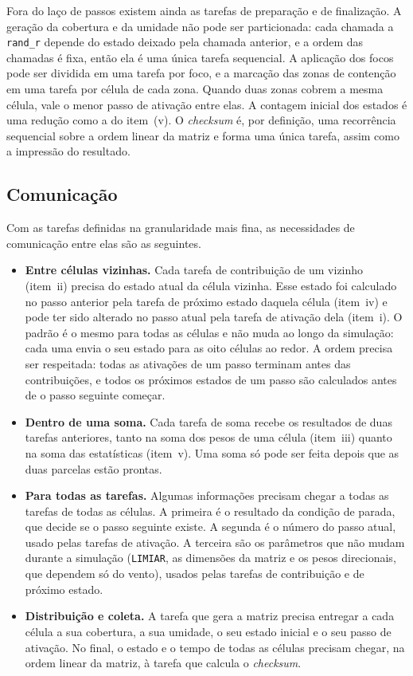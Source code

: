 \documentclass[11pt,a4paper]{article}
\begin{document}
Fora do laço de passos existem ainda as tarefas de preparação e de finalização. A geração da cobertura e da umidade não pode ser particionada: cada chamada a \texttt{rand\_r} depende do estado deixado pela chamada anterior, e a ordem das chamadas é fixa, então ela é uma única tarefa sequencial. A aplicação dos focos pode ser dividida em uma tarefa por foco, e a marcação das zonas de contenção em uma tarefa por célula de cada zona. Quando duas zonas cobrem a mesma célula, vale o menor passo de ativação entre elas. A contagem inicial dos estados é uma redução como a do item~(v). O \emph{checksum} é, por definição, uma recorrência sequencial sobre a ordem linear da matriz e forma uma única tarefa, assim como a impressão do resultado.

\subsection{Comunicação}
\label{sec:comunicacao}

Com as tarefas definidas na granularidade mais fina, as necessidades de comunicação entre elas são as seguintes.

\begin{itemize}
    \item \textbf{Entre células vizinhas.} Cada tarefa de contribuição de um vizinho (item~ii) precisa do estado atual da célula vizinha. Esse estado foi calculado no passo anterior pela tarefa de próximo estado daquela célula (item~iv) e pode ter sido alterado no passo atual pela tarefa de ativação dela (item~i). O padrão é o mesmo para todas as células e não muda ao longo da simulação: cada uma envia o seu estado para as oito células ao redor. A ordem precisa ser respeitada: todas as ativações de um passo terminam antes das contribuições, e todos os próximos estados de um passo são calculados antes de o passo seguinte começar.
    \item \textbf{Dentro de uma soma.} Cada tarefa de soma recebe os resultados de duas tarefas anteriores, tanto na soma dos pesos de uma célula (item~iii) quanto na soma das estatísticas (item~v). Uma soma só pode ser feita depois que as duas parcelas estão prontas.
    \item \textbf{Para todas as tarefas.} Algumas informações precisam chegar a todas as tarefas de todas as células. A primeira é o resultado da condição de parada, que decide se o passo seguinte existe. A segunda é o número do passo atual, usado pelas tarefas de ativação. A terceira são os parâmetros que não mudam durante a simulação (\texttt{LIMIAR}, as dimensões da matriz e os pesos direcionais, que dependem só do vento), usados pelas tarefas de contribuição e de próximo estado.
    \item \textbf{Distribuição e coleta.} A tarefa que gera a matriz precisa entregar a cada célula a sua cobertura, a sua umidade, o seu estado inicial e o seu passo de ativação. No final, o estado e o tempo de todas as células precisam chegar, na ordem linear da matriz, à tarefa que calcula o \emph{checksum}.
\end{itemize}
\end{document}
